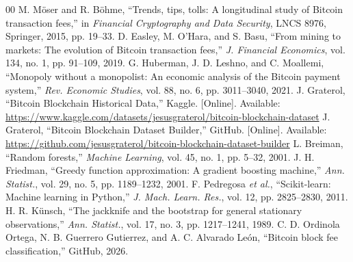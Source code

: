 \documentclass[conference]{IEEEtran}
\begin{document}
\begin{thebibliography}{00}
 M. Möser and R. Böhme, ``Trends, tips, tolls: A longitudinal study of Bitcoin transaction fees,'' in \textit{Financial Cryptography and Data Security}, LNCS 8976, Springer, 2015, pp. 19--33.
 D. Easley, M. O'Hara, and S. Basu, ``From mining to markets: The evolution of Bitcoin transaction fees,'' \textit{J. Financial Economics}, vol. 134, no. 1, pp. 91--109, 2019.
 G. Huberman, J. D. Leshno, and C. Moallemi, ``Monopoly without a monopolist: An economic analysis of the Bitcoin payment system,'' \textit{Rev. Economic Studies}, vol. 88, no. 6, pp. 3011--3040, 2021.
 J. Graterol, ``Bitcoin Blockchain Historical Data,'' Kaggle. [Online]. Available: \url{https://www.kaggle.com/datasets/jesusgraterol/bitcoin-blockchain-dataset}
 J. Graterol, ``Bitcoin Blockchain Dataset Builder,'' GitHub. [Online]. Available: \url{https://github.com/jesusgraterol/bitcoin-blockchain-dataset-builder}
 L. Breiman, ``Random forests,'' \textit{Machine Learning}, vol. 45, no. 1, pp. 5--32, 2001.
 J. H. Friedman, ``Greedy function approximation: A gradient boosting machine,'' \textit{Ann. Statist.}, vol. 29, no. 5, pp. 1189--1232, 2001.
 F. Pedregosa \textit{et al.}, ``Scikit-learn: Machine learning in Python,'' \textit{J. Mach. Learn. Res.}, vol. 12, pp. 2825--2830, 2011.
 H. R. Künsch, ``The jackknife and the bootstrap for general stationary observations,'' \textit{Ann. Statist.}, vol. 17, no. 3, pp. 1217--1241, 1989.
 C. D. Ordinola Ortega, N. B. Guerrero Gutierrez, and A. C. Alvarado León, ``Bitcoin block fee classification,'' GitHub, 2026.
\end{thebibliography}
\end{document}
